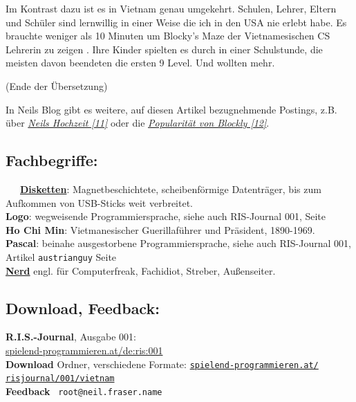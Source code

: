 Im Kontrast dazu ist es in Vietnam genau umgekehrt. Schulen, Lehrer, Eltern und Schüler sind lernwillig in einer Weise die ich in den USA nie erlebt habe. Es brauchte weniger als 10 Minuten um Blocky's Maze der Vietnamesischen CS Lehrerin zu zeigen . Ihre Kinder spielten es durch in einer Schulstunde, die meisten davon beendeten die ersten 9 Level. Und wollten mehr.

(Ende der Übersetzung)

In Neils Blog gibt es weitere, auf diesen Artikel bezugnehmende Postings, z.B. über \href{https://neil.fraser.name/news/2013/04/15/}{\textit{Neils Hochzeit [11]}} oder die \href{https://neil.fraser.name/news/2013/12/31/}{\textit{Popularität von Blockly [12]}}. 

\subsection*{Fachbegriffe:}

~~~\href{http://de.wikipedia.org/wiki/Diskette}{\textbf{Disketten}}: Magnetbeschichtete, scheibenförmige Datenträger, bis zum Aufkommen von USB-Sticks weit verbreitet. \\

\textbf{Logo}: wegweisende Programmiersprache, siehe auch RIS-Journal 001, Seite \pageref{austrianguy} \\

\textbf{Ho Chi Min}: Vietmanesischer Guerillaführer und Präsident, 1890-1969. \\

\textbf{Pascal}: beinahe ausgestorbene Programmiersprache, siehe auch RIS-Journal 001, Artikel \texttt{austrianguy} Seite \pageref{austrianguy} \\

\href{https://de.wikipedia.org/wiki/Nerd}{\textbf{Nerd}} engl. für Computerfreak, Fachidiot, Streber, Außenseiter.


\subsection*{Download, Feedback:}
\textbf{R.I.S.-Journal}, Ausgabe 001: \\
\href{http://spielend-programmieren.at/de:ris:001}{spielend-programmieren.at/de:ris:001}\\
\textbf{Download} Ordner, verschiedene Formate: \href{http://spielend-programmieren.at/risjournal/001/vietnam}{\texttt{spielend-programmieren.at/\\risjournal/001/vietnam}} \\
\textbf{Feedback} \Letter\ \texttt{root@neil.fraser.name} \\

